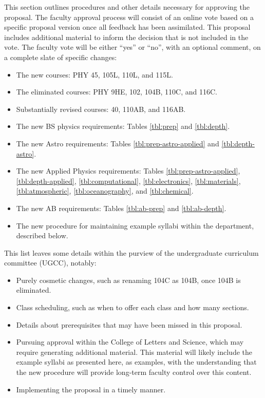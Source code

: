 \documentclass[12pt]{article}
\begin{document}
This section outlines procedures and other details necessary for
approving the proposal.  The faculty approval process will consist of
an online vote based on a specific proposal version once all feedback
has been assimilated.  This proposal includes additional material to
inform the decision that is not included in the vote.  The faculty
vote will be either ``yes'' or ``no'', with an optional comment, on a
complete slate of specific changes:
\begin{itemize}
 \item The new courses: PHY 45, 105L, 110L, and 115L.
 \item The eliminated courses:  PHY 9HE, 102, 104B, 110C, and 116C.
 \item Substantially revised courses: 40, 110AB, and 116AB.
 \item The new BS physics requirements: Tables \ref{tbl:prep} and \ref{tbl:depth}.
 \item The new Astro requirements: Tables \ref{tbl:prep-astro-applied} and \ref{tbl:depth-astro}.   
 \item The new Applied Physics requirements: Tables \ref{tbl:prep-astro-applied}, \ref{tbl:depth-applied},
\ref{tbl:computational}, \ref{tbl:electronics}, \ref{tbl:materials}, \ref{tbl:atmospheric}, \ref{tbl:oceanography}, and \ref{tbl:chemical}.   
 \item The new AB requirements: Tables \ref{tbl:ab-prep} and \ref{tbl:ab-depth}.
 \item The new procedure for maintaining example syllabi within the department, described below.
\end{itemize}
This list leaves some details within the purview of the undergraduate
curriculum committee (UGCC), notably:
\begin{itemize}
 \item Purely cosmetic changes, such as renaming 104C as 104B, once 104B is eliminated.
 \item Class scheduling, such as when to offer each class and how many sections.
 \item Details about prerequisites that may have been missed in this proposal.
 \item Pursuing approval within the College of Letters and Science, which may require
   generating additional material.  This material will likely include
   the example syllabi as presented here, as examples, with the
   understanding that the new procedure will provide long-term faculty
   control over this content.
 \item Implementing the proposal in a timely manner.
\end{itemize}
\end{document}
